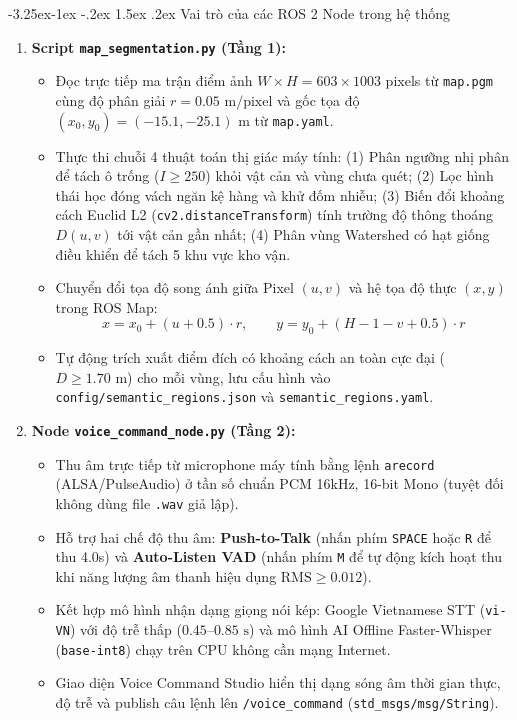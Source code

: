\documentclass[11pt,a4paper]{article}
\makeatletter
\renewcommand{\subsection}{\@startsection{subsection}{2}{\z@}%
  {-3.25ex\@plus -1ex \@minus -.2ex}%
  {1.5ex \@plus .2ex}%
  {\normalfont\normalsize\bfseries\color{secondary}}}
\makeatother
\begin{document}
\subsection{Vai trò của các ROS 2 Node trong hệ thống}
\begin{enumerate}
  \item \textbf{Script \texttt{map\_segmentation.py} (Tầng 1):}
  \begin{itemize}
    \item Đọc trực tiếp ma trận điểm ảnh $W \times H = 603 \times 1003$ pixels từ \texttt{map.pgm} cùng độ phân giải $r = 0.05\text{ m/pixel}$ và gốc tọa độ $(x_0, y_0) = (-15.1, -25.1)\text{ m}$ từ \texttt{map.yaml}.
    \item Thực thi chuỗi 4 thuật toán thị giác máy tính: (1) Phân ngưỡng nhị phân để tách ô trống ($I \ge 250$) khỏi vật cản và vùng chưa quét; (2) Lọc hình thái học đóng vách ngăn kệ hàng và khử đốm nhiễu; (3) Biến đổi khoảng cách Euclid L2 (\texttt{cv2.distanceTransform}) tính trường độ thông thoáng $D(u, v)$ tới vật cản gần nhất; (4) Phân vùng Watershed có hạt giống điều khiển để tách 5 khu vực kho vận.
    \item Chuyển đổi tọa độ song ánh giữa Pixel $(u, v)$ và hệ tọa độ thực $(x, y)$ trong ROS Map:
    \begin{equation}
      x = x_0 + (u + 0.5) \cdot r, \qquad y = y_0 + (H - 1 - v + 0.5) \cdot r
    \end{equation}
    \item Tự động trích xuất điểm đích có khoảng cách an toàn cực đại ($D \ge 1.70\text{ m}$) cho mỗi vùng, lưu cấu hình vào \texttt{config/semantic\_regions.json} và \texttt{semantic\_regions.yaml}.
  \end{itemize}

  \item \textbf{Node \texttt{voice\_command\_node.py} (Tầng 2):}
  \begin{itemize}
    \item Thu âm trực tiếp từ microphone máy tính bằng lệnh \texttt{arecord} (ALSA/PulseAudio) ở tần số chuẩn PCM 16kHz, 16-bit Mono (tuyệt đối không dùng file \texttt{.wav} giả lập).
    \item Hỗ trợ hai chế độ thu âm: \textbf{Push-to-Talk} (nhấn phím \texttt{SPACE} hoặc \texttt{R} để thu 4.0s) và \textbf{Auto-Listen VAD} (nhấn phím \texttt{M} để tự động kích hoạt thu khi năng lượng âm thanh hiệu dụng $\text{RMS} \ge 0.012$).
    \item Kết hợp mô hình nhận dạng giọng nói kép: Google Vietnamese STT (\texttt{vi-VN}) với độ trễ thấp ($0.45\text{--}0.85\text{ s}$) và mô hình AI Offline Faster-Whisper (\texttt{base-int8}) chạy trên CPU không cần mạng Internet.
    \item Giao diện Voice Command Studio hiển thị dạng sóng âm thời gian thực, độ trễ và publish câu lệnh lên \texttt{/voice\_command} (\texttt{std\_msgs/msg/String}).
  \end{itemize}


\end{enumerate}
\end{document}
